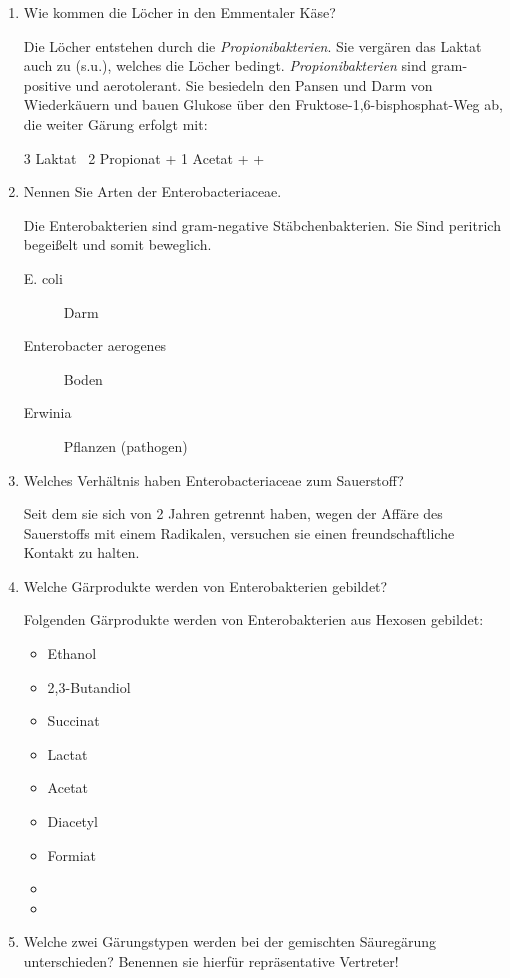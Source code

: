 \begin{enumerate}
	\item Wie kommen die Löcher in den Emmentaler Käse?

		Die Löcher entstehen durch die \emph{Propionibakterien}.
		Sie vergären das Laktat auch zu  (s.u.),
		welches die Löcher bedingt.
		\emph{Propionibakterien} sind gram-positive und	aerotolerant.
		Sie besiedeln den Pansen und Darm von Wiederkäuern und bauen Glukose über den
		Fruktose-1,6-bisphosphat-Weg ab, die weiter Gärung erfolgt mit:
		
		3 Laktat \textrightarrow \ 2 Propionat + 1 Acetat +  + 

	\item Nennen Sie Arten der Enterobacteriaceae.

		Die Enterobakterien sind gram-negative Stäbchenbakterien.
		Sie Sind peritrich begeißelt und somit beweglich.

		\begin{description}
			\item[E. coli] Darm
			\item[Enterobacter aerogenes] Boden
			\item[Erwinia] Pflanzen (pathogen)
		\end{description}

	\item Welches Verhältnis haben Enterobacteriaceae zum Sauerstoff?

		Seit dem sie sich von 2 Jahren getrennt haben, wegen der Affäre des Sauerstoffs mit einem Radikalen,
		versuchen sie einen freundschaftliche Kontakt zu halten.

	\item Welche Gärprodukte werden von Enterobakterien gebildet?

		Folgenden Gärprodukte werden von Enterobakterien aus Hexosen gebildet:
		\begin{itemize}
			\item Ethanol
			\item 2,3-Butandiol
			\item Succinat
			\item Lactat
			\item Acetat
			\item Diacetyl
			\item Formiat
			\item {}
			\item {}
		\end{itemize}

	\item Welche zwei Gärungstypen werden bei der gemischten Säuregärung unterschieden? Benennen sie hierfür repräsentative Vertreter!
	

\end{enumerate}
